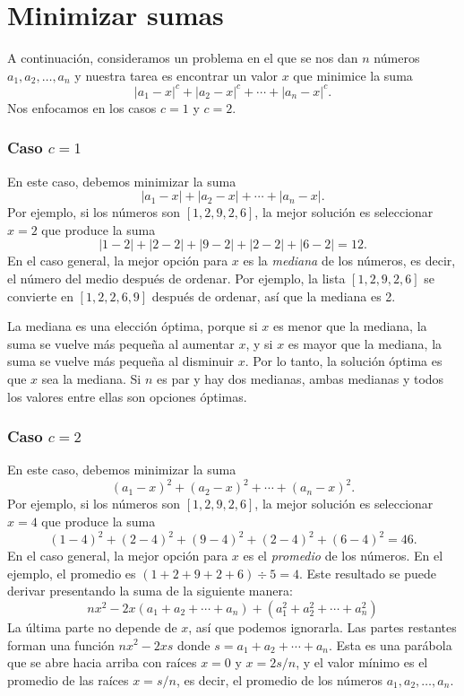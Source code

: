 \section{Minimizar sumas}

A continuación, consideramos un problema en el que
se nos dan $n$ números $a_1,a_2,\ldots,a_n$
y nuestra tarea es encontrar un valor $x$
que minimice la suma
\[|a_1-x|^c+|a_2-x|^c+\cdots+|a_n-x|^c.\]
Nos enfocamos en los casos $c=1$ y $c=2$.

\subsubsection{Caso $c=1$}

En este caso, debemos minimizar la suma
\[|a_1-x|+|a_2-x|+\cdots+|a_n-x|.\]
Por ejemplo, si los números son $[1,2,9,2,6]$,
la mejor solución es seleccionar $x=2$
que produce la suma
\[
    |1-2|+|2-2|+|9-2|+|2-2|+|6-2|=12.
\]
En el caso general, la mejor opción para $x$
es la \textit{mediana} de los números,
es decir, el número del medio después de ordenar.
Por ejemplo, la lista $[1,2,9,2,6]$
se convierte en $[1,2,2,6,9]$ después de ordenar,
así que la mediana es 2.

La mediana es una elección óptima,
porque si $x$ es menor que la mediana,
la suma se vuelve más pequeña al aumentar $x$,
y si $x$ es mayor que la mediana,
la suma se vuelve más pequeña al disminuir $x$.
Por lo tanto, la solución óptima es que $x$
sea la mediana.
Si $n$ es par y hay dos medianas,
ambas medianas y todos los valores entre ellas
son opciones óptimas.

\subsubsection{Caso $c=2$}

En este caso, debemos minimizar la suma
\[(a_1-x)^2+(a_2-x)^2+\cdots+(a_n-x)^2.\]
Por ejemplo, si los números son $[1,2,9,2,6]$,
la mejor solución es seleccionar $x=4$
que produce la suma
\[
    (1-4)^2+(2-4)^2+(9-4)^2+(2-4)^2+(6-4)^2=46.
\]
En el caso general, la mejor opción para $x$
es el \emph{promedio} de los números.
En el ejemplo, el promedio es $(1+2+9+2+6)\div5=4$.
Este resultado se puede derivar presentando
la suma de la siguiente manera:
\[
    nx^2 - 2x(a_1+a_2+\cdots+a_n) + (a_1^2+a_2^2+\cdots+a_n^2)
\]
La última parte no depende de $x$,
así que podemos ignorarla.
Las partes restantes forman una función
$nx^2-2xs$ donde $s=a_1+a_2+\cdots+a_n$.
Esta es una parábola que se abre hacia arriba
con raíces $x=0$ y $x=2s/n$,
y el valor mínimo es el promedio
de las raíces $x=s/n$, es decir,
el promedio de los números $a_1,a_2,\ldots,a_n$.


